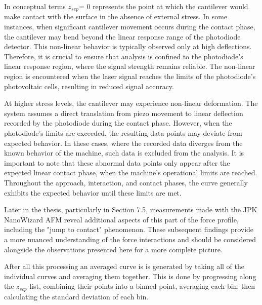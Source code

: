 In conceptual terms $z_{sep} \textit{= 0}$ represents the point at which the cantilever would make contact with the surface in the absence of external stress. In some instances, when significant cantilever movement occurs during the contact phase, the cantilever may bend beyond the linear response range of the photodiode detector. This non-linear behavior is typically observed only at high deflections. Therefore, it is crucial to ensure that analysis is confined to the photodiode’s linear response region, where the signal strength remains reliable. The non-linear region is encountered when the laser signal reaches the limits of the photodiode's photovoltaic cells, resulting in reduced signal accuracy.

At higher stress levels, the cantilever may experience non-linear deformation. The system assumes a direct translation from piezo movement to linear deflection recorded by the photodiode during the contact phase. However, when the photodiode's limits are exceeded, the resulting data points may deviate from expected behavior. In these cases, where the recorded data diverges from the known behavior of the machine, such data is excluded from the analysis. It is important to note that these abnormal data points only appear after the expected linear contact phase, when the machine's operational limits are reached. Throughout the approach, interaction, and contact phases, the curve generally exhibits the expected behavior until these limits are met.

Later in the thesis, particularly in Section 7.5, measurements made with the JPK NanoWizard AFM reveal additional aspects of this part of the force profile, including the "jump to contact" phenomenon. These subsequent findings provide a more nuanced understanding of the force interactions and should be considered alongside the  observations presented here for a more complete picture.

After all this processing an averaged curve is is generated by taking all of the individual curves and averaging them together. This is done by progressing along the $z_{sep}$ list, combining their points into a binned point, averaging each bin, then calculating the standard deviation of each bin.

